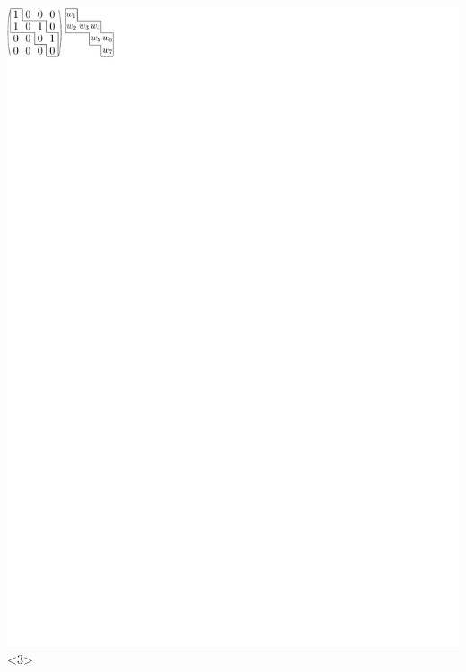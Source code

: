 \documentclass{beamer}
\begin{document}
\begin{frame}
\includegraphics{../img/walkingexample3.pdf}<3>

\end{frame}
\end{document}
